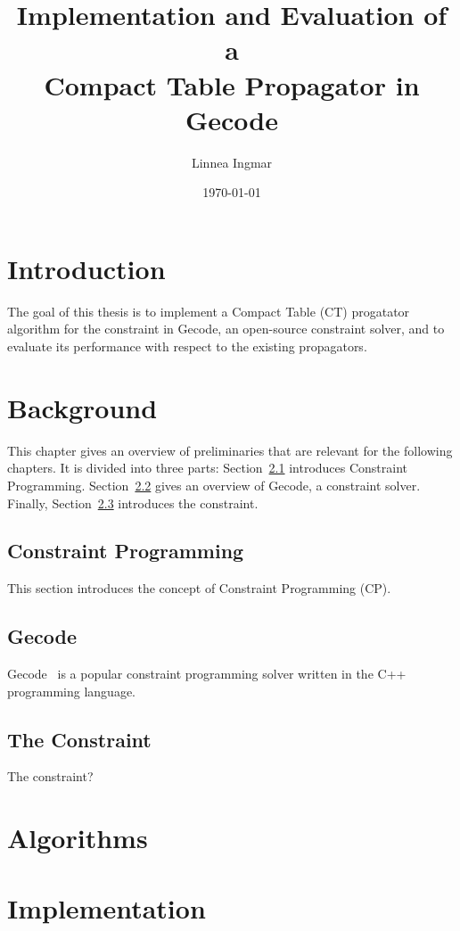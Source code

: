 \documentclass[a4paper,11pt]{article}
\title{\textbf{Implementation and Evaluation of a\\
    Compact Table Propagator in Gecode
  }
}
\author{Linnea Ingmar} %
\date{\today}
\begin{document}
\maketitle

\tableofcontents

\newpage

\section{Introduction}
\label{intro}
The goal of this thesis is to implement a Compact Table (CT) progatator
algorithm for the  constraint in Gecode,
an open-source constraint solver, and
to evaluate its performance with respect to the existing propagators.

\section{Background}
\label{bg}
This chapter gives an overview of preliminaries that are relevant for the
following chapters. It is divided into three parts: Section~\ref{bg:cp}
introduces Constraint Programming. Section~\ref{bg:gecode} gives an overview
of Gecode, a constraint solver. Finally, Section~\ref{bg:table} introduces
the  constraint.

\subsection{Constraint Programming}
\label{bg:cp}
This section introduces the concept of Constraint Programming (CP).
\subsection{Gecode}
\label{bg:gecode}
Gecode~\cite{Gecode} is a popular constraint programming solver written in the
C++ programming language. 
\subsection{The  Constraint}
\label{bg:table}
The  constraint?

\section{Algorithms}
\label{algorithms}

\section{Implementation}
\label{implementation}
\end{document}
